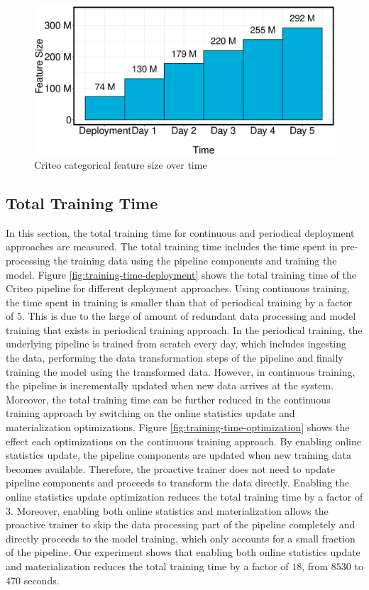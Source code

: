 \begin{figure}[H]
\includegraphics[width=\columnwidth]{../images/experiment-results/criteo-feature-discovery-experiment.eps}
\caption{Criteo categorical feature size over time}
\label{fig:criteo-feature-discovery}
\end{figure}


\subsection{Total Training Time}
In this section, the total training time for continuous and periodical deployment approaches are measured.
The total training time includes the time spent in pre-processing the training data using the pipeline components and training the model.
Figure \ref{fig:training-time-deployment} shows the total training time of the Criteo pipeline for different deployment approaches.
Using continuous training, the time spent in training is smaller than that of periodical training by a factor of $5$.
This is due to the large of amount of redundant data processing and model training that exists in periodical training approach.
In the periodical training, the underlying pipeline is trained from scratch every day, which includes ingesting the data, performing the data transformation steps of the pipeline and finally training the model using the transformed data.
However, in continuous training, the pipeline is incrementally updated when new data arrives at the system.
Moreover, the total training time can be further reduced in the continuous training approach by switching on the online statistics update and materialization optimizations.
Figure \ref{fig:training-time-optimization} shows the effect each optimizations on the continuous training approach.
By enabling online statistics update, the pipeline components are updated when new training data becomes available.
Therefore, the proactive trainer does not need to update pipeline components and proceeds to transform the data directly.
Enabling the online statistics update optimization reduces the total training time by a factor of 3.
Moreover, enabling both online statistics and materialization allows the proactive trainer to skip the data processing part of the pipeline completely and directly proceeds to the model training, which only accounts for a small fraction of the pipeline.
Our experiment shows that enabling both online statistics update and materialization reduces the total training time by a factor of $18$, from $8530$ to $470$ seconds.

